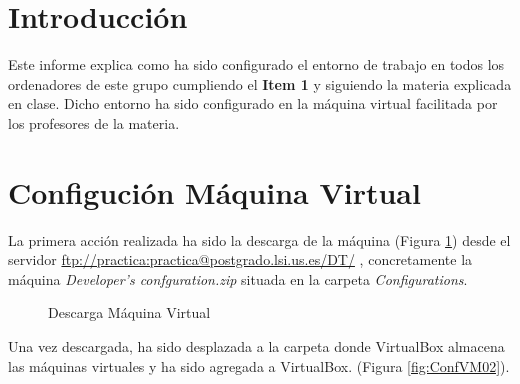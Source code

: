 \documentclass{scrartcl}
\begin{document}




\section{Introducción}
Este informe explica como ha sido configurado el entorno de trabajo en todos los ordenadores de este grupo cumpliendo el \textbf{Item 1} y siguiendo la materia explicada en clase. Dicho entorno ha sido configurado en la máquina virtual facilitada por los profesores de la materia.
\section{Configución Máquina Virtual}
La primera acción realizada ha sido la descarga de la máquina  (Figura \ref{fig:ConfVM01}) desde el servidor \href{ftp://practica:practica@postgrado.lsi.us.es/DT/}{ftp://practica:practica@postgrado.lsi.us.es/DT/} , concretamente la máquina \textit{Developer's confguration.zip}  situada en la carpeta  \textit{Configurations}.

\begin{figure}[H]
	
	\centering
	\caption{Descarga Máquina Virtual}
	\label{fig:ConfVM01}
	
\end{figure}

Una vez descargada, ha sido desplazada a la carpeta donde VirtualBox almacena las máquinas virtuales y ha sido agregada a VirtualBox. (Figura \ref{fig:ConfVM02}).
\end{document}
